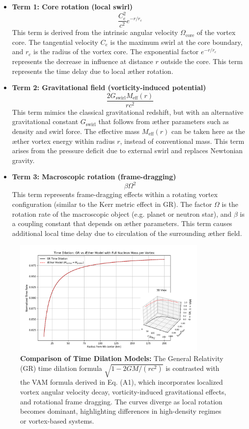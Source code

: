\begin{itemize}
  \item \textbf{Term 1: Core rotation (local swirl)}
  \[
    \frac{C_e^2}{c^2} e^{-r/r_c}
  \]
  This term is derived from the intrinsic angular velocity $\Omega_\text{core}$ of the vortex core. The tangential velocity $C_e$ is the maximum swirl at the core boundary, and $r_c$ is the radius of the vortex core. The exponential factor $e^{-r/r_c}$ represents the decrease in influence at distance $r$ outside the core. This term represents the time delay due to local æther rotation.

  \item \textbf{Term 2: Gravitational field (vorticity-induced potential)}
  \[
    \frac{2 G_\text{swirl} M_\text{eff}(r)}{r c^2}
  \]
  This term mimics the classical gravitational redshift, but with an alternative gravitational constant $G_\text{swirl}$ that follows from æther parameters such as density and swirl force. The effective mass $M_\text{eff}(r)$ can be taken here as the æther vortex energy within radius $r$, instead of conventional mass. This term arises from the pressure deficit due to external swirl and replaces Newtonian gravity.

  \item \textbf{Term 3: Macroscopic rotation (frame-dragging)}
  \[
    \beta \Omega^2
  \]
  This term represents frame-dragging effects within a rotating vortex configuration (similar to the Kerr metric effect in GR). The factor $\Omega$ is the rotation rate of the macroscopic object (e.g. planet or neutron star), and $\beta$ is a coupling constant that depends on æther parameters. This term causes additional local time delay due to circulation of the surrounding æther field.

\end{itemize}

\begin{figure}[H]
  \centering
  \includegraphics[width=0.85\textwidth]{07-TimeDilationGRVsVAM}
  \caption{
  \textbf{Comparison of Time Dilation Models:} The General Relativity (GR) time dilation formula \(\sqrt{1 - 2GM/(rc^2)}\) is contrasted with the VAM formula derived in Eq. (A1), which incorporates localized vortex angular velocity decay, vorticity-induced gravitational effects, and rotational frame dragging. The curves diverge as local rotation becomes dominant, highlighting differences in high-density regimes or vortex-based systems.
  }
  \label{fig:GRvsVAMTimeDilation}
\end{figure}



